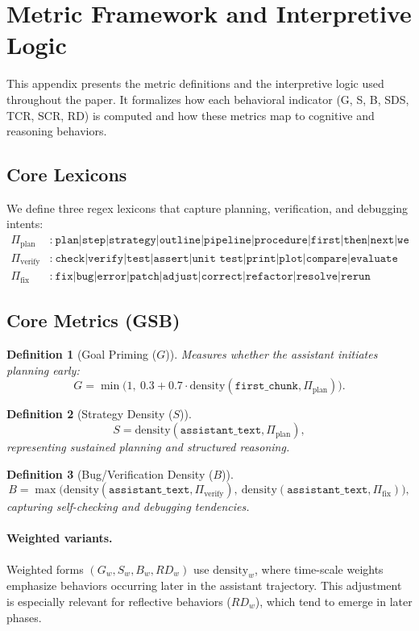 \documentclass[11pt]{article}
\newtheorem{definition}{Definition}
\newcommand{\density}{\mathrm{density}}
\newcommand{\densityw}{\mathrm{density}_{w}}
\newcommand{\plan}{\Pi_{\text{plan}}}
\newcommand{\verify}{\Pi_{\text{verify}}}
\newcommand{\fix}{\Pi_{\text{fix}}}
\begin{document}
\clearpage
\appendix
\section{Metric Framework and Interpretive Logic}
\label{appendix:metric-framework}

This appendix presents the metric definitions and the interpretive logic used throughout the paper.
It formalizes how each behavioral indicator (G, S, B, SDS, TCR, SCR, RD) is computed and how these
metrics map to cognitive and reasoning behaviors.

\subsection{Core Lexicons}
We define three regex lexicons that capture planning, verification, and debugging intents:
\begin{align*}
\plan&:\ \texttt{plan|step|strategy|outline|pipeline|procedure|first|then|next|we will} \\
\verify&:\ \texttt{check|verify|test|assert|unit test|print|plot|compare|evaluate} \\
\fix&:\ \texttt{fix|bug|error|patch|adjust|correct|refactor|resolve|rerun}
\end{align*}

\subsection{Core Metrics (GSB)}
\begin{definition}[Goal Priming ($G$)]
Measures whether the assistant initiates planning early:
\[
G = \min\!\bigl(1,\ 0.3 + 0.7 \cdot \density(\texttt{first\_chunk}, \plan)\bigr).
\]
\end{definition}

\begin{definition}[Strategy Density ($S$)]
\[
S = \density(\texttt{assistant\_text}, \plan),
\]
representing sustained planning and structured reasoning.
\end{definition}

\begin{definition}[Bug/Verification Density ($B$)]
\[
B = \max\!\bigl(\density(\texttt{assistant\_text}, \verify),\ \density(\texttt{assistant\_text}, \fix)\bigr),
\]
capturing self-checking and debugging tendencies.
\end{definition}

\paragraph{Weighted variants.}
Weighted forms $(G_w, S_w, B_w, RD_w)$ use $\densityw$, where time-scale weights
emphasize behaviors occurring later in the assistant trajectory. This adjustment is especially relevant for reflective behaviors ($RD_w$), which tend to emerge in later phases.
\end{document}
